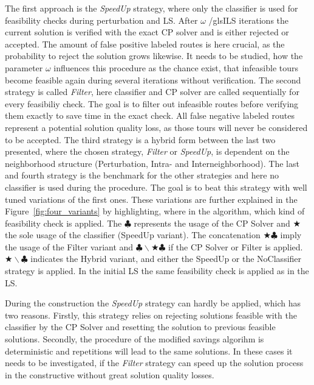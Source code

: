 The first approach is the \textit{SpeedUp} strategy, where only the classifier is used for feasibility checks during perturbation and
\gls{LS}. After $\omega$ /gls{ILS} iterations the current solution is verified with the exact \gls{CP} solver and is either rejected or accepted.
The amount of false positive labeled routes is here crucial, as the probability to reject the solution grows likewise. It needs
to be studied, how the parameter $\omega$ influences this procedure as the chance exist, that infeasible tours become feasible
again during several iterations without verification.
The second strategy is called \textit{Filter}, here classifier and \gls{CP} solver are called sequentially for every
feasibiliy check. The goal is to filter out infeasible routes before verifying them exactly to save time in the exact check.
All false negative labeled routes represent a potential solution quality loss, as those tours will never be considered to be accepted.
The third strategy is a hybrid form between the last two presented, where the chosen strategy, \textit{Filter} or \textit{SpeedUp},
is dependent on the neighborhood structure (Perturbation, Intra- and Interneighborhood). The last and fourth strategy is the benchmark
for the other strategies and here no classifier is used during the procedure. The goal is to beat this strategy with well tuned
variations of the first ones. These variations are further explained in the Figure~\ref{fig:four_variants} by highlighting, where
in the algorithm, which kind of feasibility check is applied. The $\clubsuit$ represents the usage of the \gls{CP} Solver and
$\bigstar$ the sole usage of the classifier (SpeedUp variant). The concatenation $\bigstar\clubsuit$ imply the usage of the Filter
variant and \(\clubsuit \backslash \bigstar\clubsuit\) if the \gls{CP} Solver or Filter is applied. \(\bigstar\backslash\clubsuit\)
indicates the Hybrid variant, and either the SpeedUp or the NoClassifier strategy is applied. In the initial \gls{LS} the same
feasibility check is applied as in the \gls{LS}.



During the construction the \textit{SpeedUp} strategy can hardly be applied, which has two reasons. Firstly, this strategy relies
on rejecting solutions feasible with the classifier by the \gls{CP} Solver and resetting the solution to previous feasible solutions.
Secondly, the procedure of the modified savings algorihm is deterministic and repetitions will lead to the same solutions. In these
cases it needs to be investigated, if the \textit{Filter} strategy can speed up the solution process in the constructive without
great solution quality losses.


